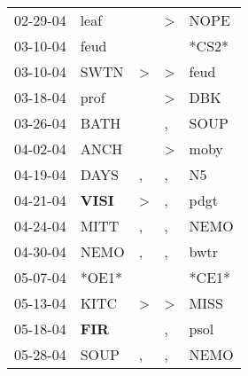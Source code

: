 \begin{supertabular}{p{0.07\textwidth}p{0.06\textwidth}p{0.02\textwidth}p{0.02\textwidth}p{0.06\textwidth}}
          02-29-04\textsuperscript{} &           leaf\textsuperscript{} &                  &     \textgreater &           NOPE\textsuperscript{} \\
          03-10-04\textsuperscript{} &           feud\textsuperscript{} &                  &                  &                            *CS2* \\
          03-10-04\textsuperscript{} &           SWTN\textsuperscript{} &     \textgreater &     \textgreater &           feud\textsuperscript{} \\
          03-18-04\textsuperscript{} &           prof\textsuperscript{} &                  &     \textgreater &            DBK\textsuperscript{} \\
          03-26-04\textsuperscript{} &           BATH\textsuperscript{} &                  &                , &           SOUP\textsuperscript{} \\
          04-02-04\textsuperscript{} &           ANCH\textsuperscript{} &                  &     \textgreater &           moby\textsuperscript{} \\
          04-19-04\textsuperscript{} &           DAYS\textsuperscript{} &                , &                , &             N5\textsuperscript{} \\
          04-21-04\textsuperscript{} &  \textbf{VISI\textsuperscript{}} &     \textgreater &                , &           pdgt\textsuperscript{} \\
          04-24-04\textsuperscript{} &           MITT\textsuperscript{} &                , &                , &           NEMO\textsuperscript{} \\
          04-30-04\textsuperscript{} &           NEMO\textsuperscript{} &                , &                , &           bwtr\textsuperscript{} \\
          05-07-04\textsuperscript{} &                            *OE1* &                  &                  &                            *CE1* \\
          05-13-04\textsuperscript{} &           KITC\textsuperscript{} &     \textgreater &     \textgreater &           MISS\textsuperscript{} \\
          05-18-04\textsuperscript{} &   \textbf{FIR\textsuperscript{}} &                  &                , &           psol\textsuperscript{} \\
          05-28-04\textsuperscript{} &           SOUP\textsuperscript{} &                , &                , &           NEMO\textsuperscript{} \\

\end{supertabular}
